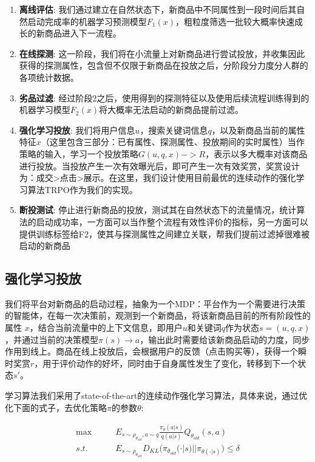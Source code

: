 \begin{enumerate}  
\item \textbf{离线评估}: 我们通过建立在自然状态下，新商品中不同属性到一段时间后其自然启动完成率的机器学习预测模型$F_1(x)$，粗粒度筛选一批较大概率快速成长的新商品进入下一流程。
\item \textbf{在线探测}: 这一阶段，我们将在小流量上对新商品进行尝试投放，并收集因此获得的探测属性，包含但不仅限于新商品在投放之后，分阶段分力度分人群的各项统计数据。
\item \textbf{劣品过滤}: 经过阶段2之后，使用得到的探测特征以及使用后续流程训练得到的机器学习模型$F_2(x)$将大概率无法启动的新商品提前过滤。
\item \textbf{强化学习投放}: 我们将用户信息$u$，搜索关键词信息$q$，以及新商品当前的属性特征$x$（这里包含三部分：已有属性、探测属性、投放期间的实时属性）当作策略的输入，学习一个投放策略$G(u,q,x)->R$，表示以多大概率对该商品进行投放。当投放产生一次有效曝光后，即可产生一次有效奖赏，奖赏设计为：成交>点击>展示。在这里，我们设计使用目前最优的连续动作的强化学习算法TRPO作为我们的实现。
\item \textbf{断投测试}: 停止进行新商品的投放，测试其在自然状态下的流量情况，统计算法的启动成功率，一方面可以当作整个流程有效性评价的指标，另一方面可以提供训练标签给F2，使其与探测属性之间建立关联，帮我们提前过滤掉很难被启动的新商品
\end{enumerate}

\subsection{强化学习投放}
我们将平台对新商品的启动过程，抽象为一个MDP：平台作为一个需要进行决策的智能体，在每一次决策前，观测到一个新商品，将该新商品目前的所有阶段性的属性
$x$，结合当前流量中的上下文信息，即用户$u$和关键词$q$作为状态$s=(u,q,x)$，并通过当前的决策模型$\pi(s) \to a$，输出此时需要给该新商品启动的力度，同步作用到线上。商品在线上投放后，会根据用户的反馈（点击购买等），获得一个瞬时奖赏$r$，用于评价动作的好坏，同时由于自身属性发生了变化，转移到下一个状态$s'$。

学习算法我们采用了state-of-the-art的连续动作强化学习算法，具体来说，通过优化下面的式子，去优化策略$\pi$的参数$\theta$:

\begin{align}
\max & \quad \quad E_{s \sim \rho_{\theta_{old}},a \sim q} \frac{\pi_{\theta}(a|s)}{q(a|s)} Q_{\theta_{old}}(s,a) \nonumber \\
s.t. & \quad \quad E_{s \sim \rho_{\theta_{old}}} D_{KL} \big( \pi_{\theta_{old}}(\cdot|s) || \pi_{\theta(\cdot|s)} \big) \le \delta \nonumber
\end{align}

